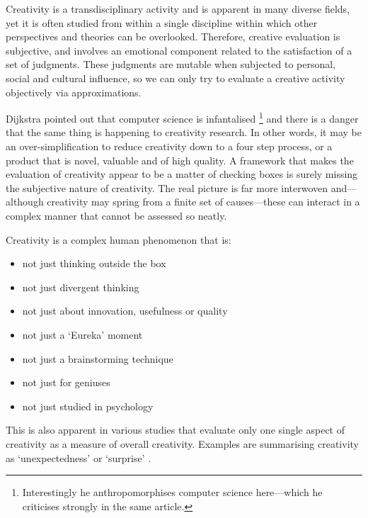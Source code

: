 Creativity is a transdisciplinary activity and is apparent in many diverse fields, yet it is often studied from within a single discipline within which other perspectives and theories can be overlooked. Therefore, creative evaluation is subjective, and involves an emotional component related to the satisfaction of a set of judgments. These judgments are mutable when subjected to personal, social and cultural influence, so we can only try to evaluate a creative activity objectively via approximations.

Dijkstra pointed out that computer science is infantalised \autocite*{Dijkstra1988}\footnote{Interestingly he anthropomorphises computer science here---which he criticises strongly in the same article.} and there is a danger that the same thing is happening to creativity research. In other words, it may be an over-simplification to reduce creativity down to a four step process, or a product that is novel, valuable and of high quality. A framework that makes the evaluation of creativity appear to be a matter of checking boxes is surely missing the subjective nature of creativity. The real picture is far more interwoven and---although creativity may spring from a finite set of causes---these can interact in a complex manner that cannot be assessed so neatly.

Creativity is a complex human phenomenon that is:

\begin{itemize}
  \item not just thinking outside the box
  \item not just divergent thinking
  \item not just about innovation, usefulness or quality
  \item not just a `Eureka' moment
  \item not just a brainstorming technique
  \item not just for geniuses
  \item not just studied in psychology
\end{itemize}

This is also apparent in various studies that evaluate only one single aspect of creativity as a measure of overall creativity. Examples are summarising creativity as `unexpectedness' \autocite{Kazjon2014} or `surprise' \autocite{Maher2013}.


